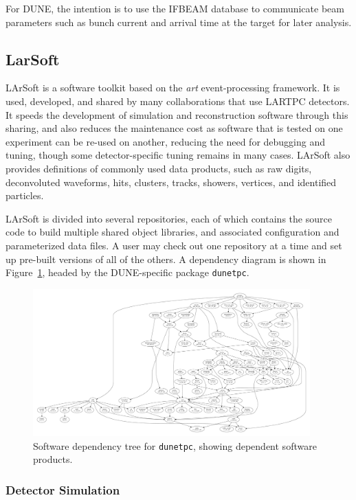 For DUNE, the intention is to use the IFBEAM database to communicate beam parameters such as bunch current
and arrival time at the target for later analysis.

\subsection{LarSoft}

LArSoft is a software toolkit based on the {\it art} event-processing framework.  It is used, developed, and
shared by many collaborations that use LARTPC detectors.  It speeds the development of simulation and reconstruction
software through this sharing, and also reduces the maintenance cost as software that is tested on one
experiment can be re-used on another, reducing the need for debugging and tuning, though some detector-specific
tuning remains in many cases.  LArSoft also provides definitions of commonly used data products, such as raw digits,
deconvoluted waveforms, hits, clusters, tracks, showers, vertices, and identified particles.

LArSoft is divided into several repositories, each of which contains the source code to build multiple shared
object libraries, and associated configuration and parameterized data files.  A user may check out one repository
at a time and set up pre-built versions of all of the others.  A dependency diagram is shown in 
Figure~\ref{fig:swdeptree}, headed by the DUNE-specific package {\tt dunetpc}.

\begin{figure}
\includegraphics[width=0.95\textwidth]{software-computing/figures/dtree.pdf}
\caption{\label{fig:swdeptree} Software dependency tree for {\tt dunetpc}, showing dependent software products.}
\end{figure}

\subsubsection{Detector Simulation}

